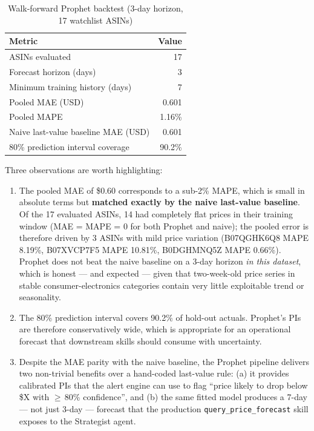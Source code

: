 \begin{table}[H]
  \centering
  \begin{tabular}{lr}
    \toprule
    \textbf{Metric} & \textbf{Value} \\
    \midrule
    ASINs evaluated                       & 17       \\
    Forecast horizon (days)               & 3        \\
    Minimum training history (days)       & 7        \\
    Pooled MAE (USD)                      & 0.601    \\
    Pooled MAPE                           & 1.16\%   \\
    Naive last-value baseline MAE (USD)   & 0.601    \\
    80\% prediction interval coverage     & 90.2\%   \\
    \bottomrule
  \end{tabular}
  \caption{Walk-forward Prophet backtest (3-day horizon, 17 watchlist ASINs)}
  \label{tab:forecast_eval}
\end{table}

Three observations are worth highlighting:

\begin{enumerate}
  \item The pooled MAE of \$0.60 corresponds to a sub-2\% MAPE, which is
  small in absolute terms but \textbf{matched exactly by the naive last-value
  baseline}. Of the 17 evaluated ASINs, 14 had completely flat
  prices in their training window (MAE = MAPE = 0 for both Prophet and
  naive); the pooled error is therefore driven by 3 ASINs with mild price
  variation (B07QGHK6Q8 MAPE 8.19\%, B07XVCP7F5 MAPE 10.81\%, B0DGHMNQ5Z
  MAPE 0.66\%). Prophet does not beat the naive baseline on a 3-day
  horizon \emph{in this dataset}, which is honest --- and expected --- given
  that two-week-old price series in stable consumer-electronics categories
  contain very little exploitable trend or seasonality.
  \item The 80\% prediction interval covers 90.2\% of hold-out actuals.
  Prophet's PIs are therefore conservatively wide, which is appropriate
  for an operational forecast that downstream skills should consume with
  uncertainty.
  \item Despite the MAE parity with the naive baseline, the Prophet pipeline
  delivers two non-trivial benefits over a hand-coded last-value rule:
  (a) it provides calibrated PIs that the alert engine can use to flag
  ``price likely to drop below \$X with $\geq$\,80\% confidence'', and (b)
  the same fitted model produces a 7-day --- not just 3-day --- forecast
  that the production \texttt{query\_price\_forecast} skill exposes to
  the Strategist agent.
\end{enumerate}

